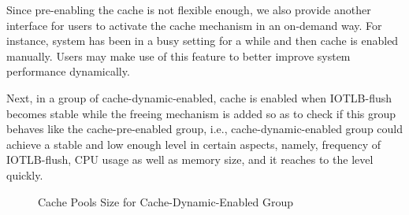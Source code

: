 Since pre-enabling the cache is not flexible enough, we also provide another interface for users to activate the cache mechanism in an on-demand way. For instance, system has been in a busy setting for a while and then cache is enabled manually. Users may make use of this feature to better improve system performance dynamically.

Next, in a group of cache-dynamic-enabled, cache is enabled when IOTLB-flush becomes stable while the freeing mechanism is added so as to check if this group behaves like the cache-pre-enabled group, i.e., cache-dynamic-enabled group could achieve a stable and low enough level in certain aspects, namely, frequency of IOTLB-flush, CPU usage as well as memory size, and it reaches to the level quickly.

\begin{figure}
\centering
{}
\hspace{1in}
\hspace{1in}
\caption{Cache Pools Size for Cache-Dynamic-Enabled Group}
\label{fig:dynPGpool} %
\end{figure}

